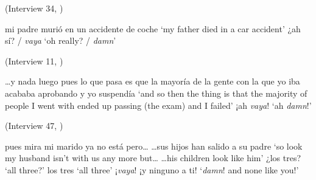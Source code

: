 \begin{exe} 
\ex \label{ex:vayaPRESEEAaccidente} (Interview 34, \cite{PRESEEA.20142020}) 
	\begin{xlist}[A:]
		 mi padre murió en un accidente de coche 
		\glt `my father died in a car accident' 
		 ¿ah sí? / \textit{vaya} 
		\glt `oh really? / \textit{damn}'  
	\end{xlist}
		
\ex \label{ex:vayaPRESEEAsuspendia} (Interview 11, \cite{PRESEEA.20142020}) 
	\begin{xlist}[A:]
		 \ldots y nada luego pues lo que pasa es que la mayoría de la gente con la que yo iba acababa aprobando y yo suspendía 
		\glt `and so then the thing is that the majority of people I went with ended up passing (the exam) and I failed' 
		 ¡ah \textit{vaya}! 
		\glt `ah \textit{damn}!'  
	\end{xlist}
\ex \label{ex:vayaPRESEEAgenio} (Interview 47, \cite{PRESEEA.20142020}) 
	\begin{xlist}[A:]
		 pues mira mi marido ya no está pero\ldots 
		\ldots sus hijos han salido a su padre 
		\glt `so look my husband isn't with us any more but\ldots 
		\ldots his children look like him' 
		 ¿los tres? 
		\glt `all three?' 
		 los tres 
		\glt `all three'  
		 ¡\textit{vaya}! ¡y ninguno a ti!  
		\glt `\textit{damn}! and none like you!'  
	\end{xlist}
\end{exe}

